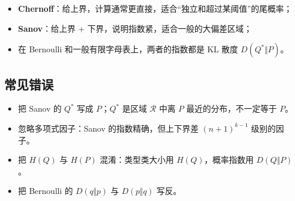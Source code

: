 \begin{itemize}
\item \textbf{Chernoff}：给上界，计算通常更直接，适合“独立和超过某阈值”的尾概率；
\item \textbf{Sanov}：给上界 + 下界，说明指数紧，适合一般的大偏差区域；
\item 在 Bernoulli 和一般有限字母表上，两者的指数都是 KL 散度 $D(Q^*\Vert P)$。
\end{itemize}


\subsection{常见错误}


\begin{itemize}
\item 把 Sanov 的 $Q^*$ 写成 $P$；$Q^*$ 是区域 $\mathcal R$ 中离 $P$ 最近的分布，不一定等于 $P$。
\item 忽略多项式因子：Sanov 的指数精确，但上下界差 $(n+1)^{k-1}$ 级别的因子。
\item 把 $H(Q)$ 与 $H(P)$ 混淆：类型类大小用 $H(Q)$，概率指数用 $D(Q\Vert P)$。
\item 把 Bernoulli 的 $D(q\Vert p)$ 与 $D(p\Vert q)$ 写反。
\end{itemize}
